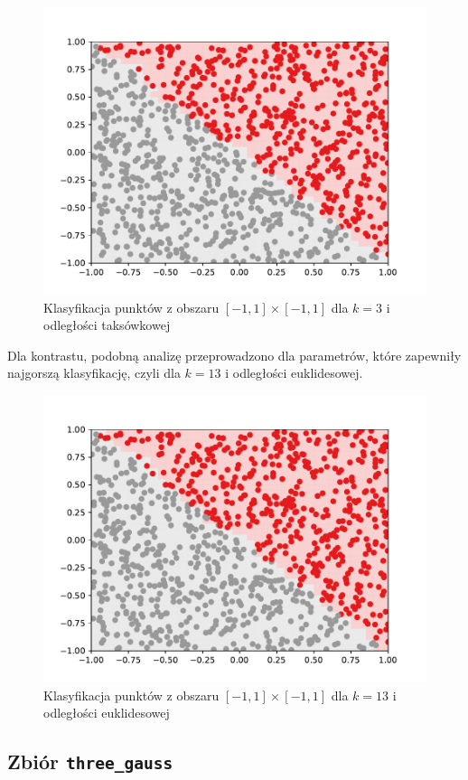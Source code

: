 \documentclass[11pt,a4paper]{article}
\begin{document}
\begin{figure}[H]
  \centering
  \includegraphics[width=.8\textwidth]{res/simple-manhattan-3.pdf}
  \caption{Klasyfikacja punktów z obszaru $[-1,1] \times [-1,1]$ dla $k = 3$ i odległości taksówkowej}
  \label{fig:simple-manhattan-3}
\end{figure}

Dla kontrastu, podobną analizę przeprowadzono dla parametrów, które zapewniły najgorszą klasyfikację, czyli dla $k=13$ i odległości euklidesowej.

\begin{figure}[H]
  \centering
  \includegraphics[width=.8\textwidth]{res/simple-euclidean-13.pdf}
  \caption{Klasyfikacja punktów z obszaru $[-1,1] \times [-1,1]$ dla $k = 13$ i odległości euklidesowej}
  \label{fig:simple-euclidean-13}
\end{figure}


\subsection{Zbiór {\tt three\_gauss}}
\end{document}
